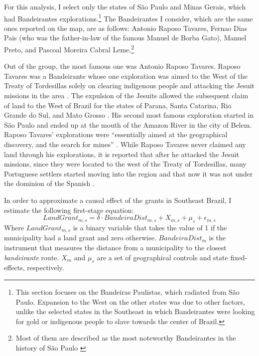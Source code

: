 \documentclass[11pt]{article}
\begin{document}


For this analysis, I select only the states of São Paulo and Minas Gerais, which had Bandeirantes explorations.\footnote{This section focuses on the Bandeiras Paulistas, which radiated from São Paulo. Expansion to the West on the other states was due to other factors, unlike the selected states in the Southeast in which Bandeirantes were looking for gold or indigenous people to slave towards the center of Brazil.} The Bandeirantes I consider, which are the same ones reported on the map, are as follows: Antonio Raposo Tavares, Fernao Dias Pais (who was the father-in-law of the famous Manuel de Borba Gato), Manuel Preto, and Pascoal Moreira Cabral Leme.\footnote{Most of them are described as the most noteworthy Bandeirantes in the history of São Paulo \parencite[p.~43]{Prestes_Filho2012-dp}}

Out of the group, the most famous one was Antonio Raposo Tavares.
Raposo Tavares was a Bandeirante whose one exploration was aimed to the West of the Treaty of Tordesillas solely on clearing indigenous people and attacking the Jesuit missions in the area \parencite[p.~406]{Franco1954-bk}.
The expulsion of the Jesuits allowed the subsequent claim of land to the West of Brazil for the states of Parana, Santa Catarina, Rio Grande do Sul, and Mato Grosso \parencite[p.~405]{Franco1954-bk}.
His second most famous exploration started in São Paulo and ended up at the mouth of the Amazon River in the city of Belem.
Raposo Tavares' explorations were ``essentially aimed at the geographical discovery, and the search for mines'' \parencite[p.~395]{Cortesao1958-hm}.
While Raposo Tavares never claimed any land through his explorations, it is reported that after he attacked the Jesuit missions, since they were located to the west of the Treaty of Tordesillas, many Portuguese settlers started moving into the region and that now it was not under the dominion of the Spanish \parencite[p.~406]{Franco1954-bk}.

In order to approximate a causal effect of the grants in Southeast Brazil, I estimate the following first-stage equation:
\begin{equation}
  \label{eqn:firststage}
  LandGrant_{m,s} = \delta \cdot BandeiraDist_{m,s} +  X_{m,s} + \mu_s  + \epsilon_{m,s}
\end{equation}
Where $LandGrant_{m,s}$ is a binary variable that takes the value of 1 if the municipality had a land grant and zero otherwise. 
$BandeiraDist_m$ is the instrument that measures the distance from a municipality to the closest \textit{bandeirante} route. 
$X_m$ and $\mu_s$ are a set of geographical controls and state fixed-effects, respectively.
\end{document}
